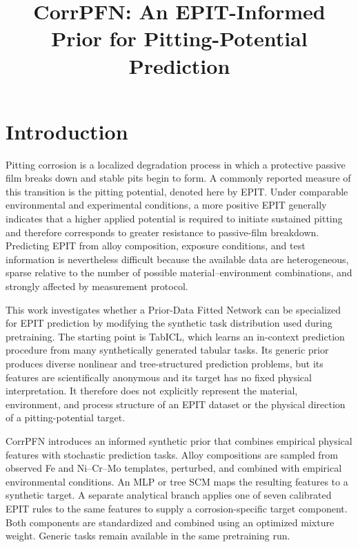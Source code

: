 \documentclass{article}
\title{CorrPFN: An EPIT-Informed Prior for Pitting-Potential Prediction}
\author{}
\date{}
\begin{document}
\maketitle

\section{Introduction}
\label{sec:introduction}

Pitting corrosion is a localized degradation process in which a protective
passive film breaks down and stable pits begin to form. A commonly reported
measure of this transition is the pitting potential, denoted here by EPIT.
Under comparable environmental and experimental conditions, a more positive
EPIT generally indicates that a higher applied potential is required to
initiate sustained pitting and therefore corresponds to greater resistance to
passive-film breakdown. Predicting EPIT from alloy composition, exposure
conditions, and test information is nevertheless difficult because the
available data are heterogeneous, sparse relative to the number of possible
material--environment combinations, and strongly affected by measurement
protocol.

This work investigates whether a Prior-Data Fitted Network can be specialized
for EPIT prediction by modifying the synthetic task distribution used during
pretraining. The starting point is TabICL, which learns an in-context
prediction procedure from many synthetically generated tabular tasks. Its
generic prior produces diverse nonlinear and tree-structured prediction
problems, but its features are scientifically anonymous and its target has no
fixed physical interpretation. It therefore does not explicitly represent the
material, environment, and process structure of an EPIT dataset or the
physical direction of a pitting-potential target.

CorrPFN introduces an informed synthetic prior that combines empirical
physical features with stochastic prediction tasks. Alloy compositions are
sampled from observed Fe and Ni--Cr--Mo templates, perturbed, and combined with
empirical environmental conditions. An MLP or tree SCM maps the resulting
features to a synthetic target. A separate analytical branch applies one of
seven calibrated EPIT rules to the same features to supply a corrosion-specific
target component. Both components are standardized and combined using an
optimized mixture weight. Generic tasks remain available in the same
pretraining run.
\end{document}
